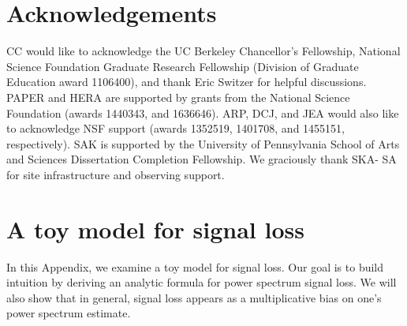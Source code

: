 \documentclass[preprint2,numberedappendix,tighten]{aastex6}  %
\begin{document}

\section{Acknowledgements}
CC would like to acknowledge the UC Berkeley Chancellor's Fellowship, National Science Foundation Graduate Research 
Fellowship (Division of Graduate Education award 1106400), and thank Eric Switzer for helpful discussions. PAPER and HERA 
are supported by grants from the National Science Foundation (awards 1440343, and 1636646). ARP, DCJ, and JEA would 
also like to acknowledge NSF support (awards 1352519, 1401708, and 1455151, respectively). SAK is supported by the University of Pennsylvania School of Arts and Sciences Dissertation Completion Fellowship. We graciously thank SKA-
SA for site infrastructure and observing support.
\label{sec:Ack}


\appendix
\section{A toy model for signal loss}
\label{sec:sigloss_appendix}

In this Appendix, we examine a toy model for signal loss. Our goal is to build intuition by deriving an analytic formula for power spectrum signal loss. We will also show that in general, signal loss appears as a multiplicative bias on one's power spectrum estimate.
\end{document}
